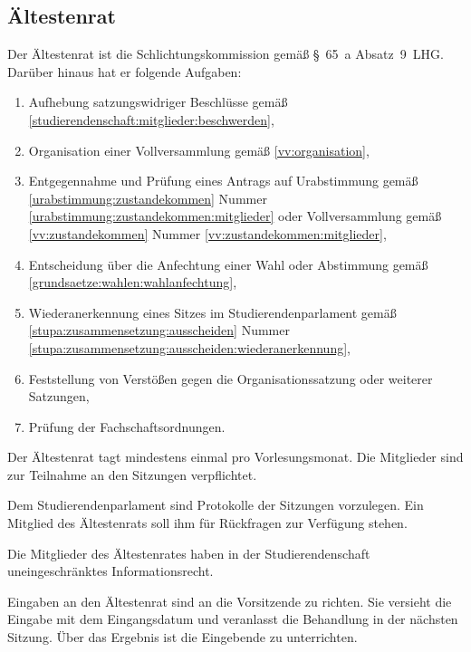 \begin{contract}
%
%

\parnumberfalse \section{Ältestenrat}\label{aera} \parnumbertrue

\label{aera:aufgaben}

Der Ältestenrat ist die Schlichtungskommission gemäß §~65~a Absatz~9~LHG. Darüber hinaus hat er folgende Aufgaben: \label{aera:aufgaben:allgemein}
  \begin{enumerate}
  \item Aufhebung satzungswidriger Beschlüsse gemäß \ref{studierendenschaft:mitglieder:beschwerden},
  \item \label{aera:aufgaben:vv} Organisation einer Vollversammlung gemäß \ref{vv:organisation},
  \item \label{aera:aufgaben:ua} Entgegennahme und Prüfung eines Antrags auf Urabstimmung  gemäß \ref{urabstimmung:zustandekommen} Nummer \ref{urabstimmung:zustandekommen:mitglieder} oder Vollversammlung gemäß \ref{vv:zustandekommen} Nummer \ref{vv:zustandekommen:mitglieder},
  \item Entscheidung über die Anfechtung einer Wahl oder Abstimmung gemäß \ref{grundsaetze:wahlen:wahlanfechtung},
  \item Wiederanerkennung eines Sitzes im Studierendenparlament  gemäß \ref{stupa:zusammensetzung:ausscheiden} Nummer \ref{stupa:zusammensetzung:ausscheiden:wiederanerkennung},
  \item Feststellung von Verstößen gegen die Organisationssatzung oder weiterer Satzungen,
  \item Prüfung der Fachschaftsordnungen.
  \end{enumerate}

Der Ältestenrat tagt mindestens einmal pro Vorlesungsmonat. Die Mitglieder sind zur Teilnahme an den Sitzungen verpflichtet.

Dem Studierendenparlament sind Protokolle der Sitzungen vorzulegen. Ein Mitglied des Ältestenrats soll ihm für Rückfragen zur Verfügung stehen.

Die Mitglieder des Ältestenrates haben in der Studierendenschaft uneingeschränktes Informationsrecht.

Eingaben an den Ältestenrat sind an die Vorsitzende zu richten. Sie versieht die Eingabe mit dem Eingangsdatum und veranlasst die Behandlung in der nächsten Sitzung. Über das Ergebnis ist die Eingebende zu unterrichten.


\end{contract}
